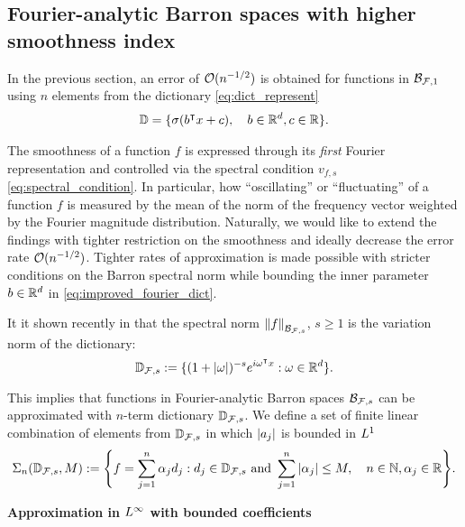 \subsection{Fourier-analytic Barron spaces with higher smoothness index}

In the previous section, an error of $\mathcal{O}(n^{-1/2})$ is obtained for functions
in $\mathcal{B}_{\mathcal{F}, 1}$ using $n$ elements from the dictionary
\eqref{eq:dict_represent}
\begin{align}
    \label{eq:improved_fourier_dict}
    \mathbb{D} = \{
        \sigma(b{}^{\intercal} x + c), \quad b\in\mathbb{R}^d, c\in\mathbb{R}
    \}.
\end{align}

The smoothness of a function $f$ is expressed through its \textit{first} Fourier
representation and controlled via the spectral condition $v_{f,s}$
\eqref{eq:spectral_condition}. In particular, how ``oscillating'' or
``fluctuating'' of a function $f$ is measured by the mean of the norm of the
frequency vector weighted by the Fourier magnitude distribution. Naturally, we
would like to extend the findings with tighter restriction on the smoothness and
ideally decrease the error rate $\mathcal{O}(n^{-1/2})$. Tighter rates of
approximation is made possible with stricter conditions on the Barron spectral
norm while bounding the inner parameter $b\in\mathbb{R}^d$ in
\eqref{eq:improved_fourier_dict}.

It it shown recently in \cite{siegelSharpBoundsApproximation2022} that the
spectral norm $\left\| f \right\|_{\mathcal{B}_{\mathcal{F}, s}}$, $s \geq 1$ is the variation
norm of the dictionary:
\begin{equation}
    \mathbb{D}_{\mathcal{F}, s} := \{
        (1 + \left| \omega \right|)^{-s} e^{i\omega{}^{\intercal} x}: \omega \in \mathbb{R}^d
    \}.
\end{equation}

This implies that functions in Fourier-analytic Barron spaces $\mathcal{B}_{\mathcal{F},
s}$ can be approximated with $n$-term dictionary $\mathbb{D}_{\mathcal{F}, s}$. We
define a set of finite linear combination of elements from
$\mathbb{D}_{\mathcal{F},s}$ in which $\left| a_j \right|$ is bounded in $L^{1}$
\begin{equation}
    \Sigma_n(\mathbb{D}_{\mathcal{F}, s}, M) := \Bigg\{
        f = \sum_{j=1}^n \alpha_j d_j: 
        d_j \in \mathbb{D}_{\mathcal{F}, s} \textnormal{ and } 
        \sum_{j=1}^n \left| \alpha_j \right| \leq M, \quad 
        n \in \mathbb{N}, \alpha_j \in \mathbb{R}
    \Bigg\}.
\end{equation}


\textbf{Approximation in $L^{\infty}$ with bounded coefficients}

